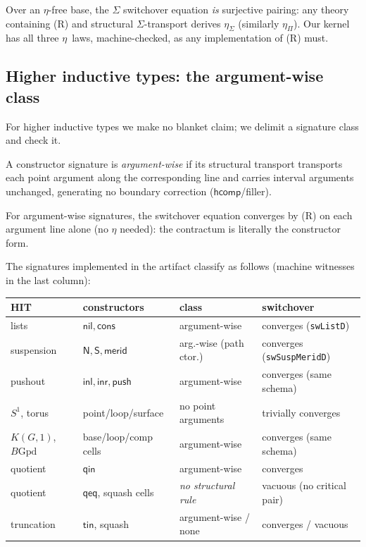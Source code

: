 \documentclass{lmcs}
\newcommand{\hcomp}{\mathsf{hcomp}}
\begin{document}
\begin{rem}\label{rem:eta}
  Over an $\eta$-free base, the $\Sigma$ switchover equation \emph{is}
  surjective pairing: any theory containing (R) and structural
  $\Sigma$-transport derives $\eta_\Sigma$ (similarly $\eta_\Pi$).
  Our kernel has all three $\eta$~laws, machine-checked, as any
  implementation of (R) must.
\end{rem}

\subsection{Higher inductive types: the argument-wise class}
\label{sec:hits}

For higher inductive types we make no blanket claim; we delimit a
signature class and check it.

\begin{defi}\label{def:argwise}
  A constructor signature is \emph{argument-wise} if its structural
  transport transports each point argument along the corresponding
  line and carries interval arguments unchanged, generating no
  boundary correction ($\hcomp$/filler).
\end{defi}

\begin{lem}\label{lem:hitconverge}
  For argument-wise signatures, the switchover equation converges by
  (R) on each argument line alone (no $\eta$ needed): the contractum
  is literally the constructor form.
\end{lem}

\noindent The signatures implemented in the artifact classify as
follows (machine witnesses in the last column):

\begin{center}
\small
\begin{tabular}{llll}
  HIT & constructors & class & switchover \\\hline
  lists & $\mathsf{nil}, \mathsf{cons}$ & argument-wise &
    converges (\texttt{swListD}) \\
  suspension & $\mathsf{N}, \mathsf{S}, \mathsf{merid}$ &
    arg.-wise (path ctor.) & converges (\texttt{swSuspMeridD}) \\
  pushout & $\mathsf{inl}, \mathsf{inr}, \mathsf{push}$ &
    argument-wise & converges (same schema) \\
  $S^1$, torus & point/loop/surface & no point arguments &
    trivially converges \\
  $K(G,1)$, $B\mathrm{Gpd}$ & base/loop/comp cells &
    argument-wise & converges (same schema) \\
  quotient & $\mathsf{qin}$ & argument-wise & converges \\
  quotient & $\mathsf{qeq}$, squash cells &
    \emph{no structural rule} & vacuous (no critical pair) \\
  truncation & $\mathsf{tin}$, squash & argument-wise / none &
    converges / vacuous \\
\end{tabular}
\end{center}
\end{document}
